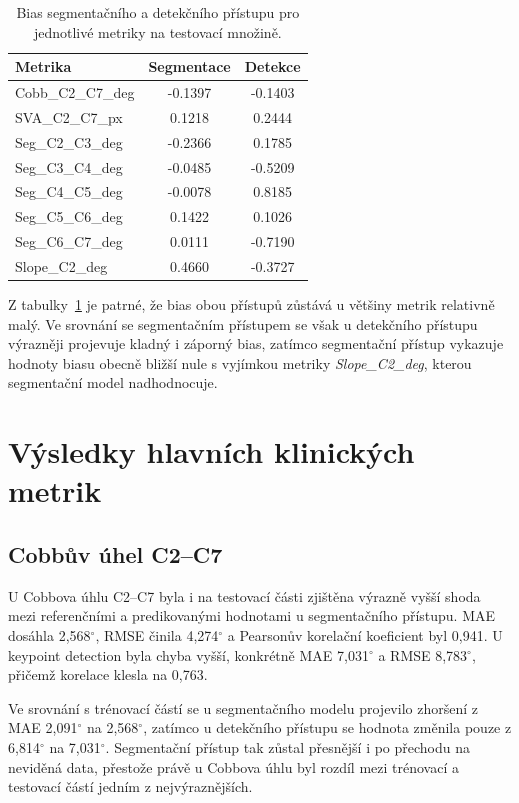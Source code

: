 \documentclass[male,czech,api_bc]{kitheses}
\begin{document}
\begin{table}[H]
\centering
\caption{Bias segmentačního a detekčního přístupu pro jednotlivé metriky na testovací množině.}
\label{tab:bias_seg_det_test}
\begin{tabular}{lcc}
\hline
Metrika & Segmentace & Detekce \\
\hline
Cobb\_C2\_C7\_deg & -0.1397 & -0.1403 \\
SVA\_C2\_C7\_px & 0.1218 & 0.2444 \\
Seg\_C2\_C3\_deg & -0.2366 & 0.1785 \\
Seg\_C3\_C4\_deg & -0.0485 & -0.5209 \\
Seg\_C4\_C5\_deg & -0.0078 & 0.8185 \\
Seg\_C5\_C6\_deg & 0.1422 & 0.1026 \\
Seg\_C6\_C7\_deg & 0.0111 & -0.7190 \\
Slope\_C2\_deg & 0.4660 & -0.3727 \\
\hline
\end{tabular}
\end{table}

Z tabulky~\ref{tab:bias_seg_det_test} je patrné, že bias obou přístupů zůstává u většiny metrik relativně malý. Ve srovnání se segmentačním přístupem se však u detekčního přístupu výrazněji projevuje kladný i záporný bias, zatímco segmentační přístup vykazuje hodnoty biasu obecně bližší nule s vyjímkou metriky \textit{Slope\_C2\_deg}, kterou segmentační model nadhodnocuje.


\section{Výsledky hlavních klinických metrik}

\subsection{Cobbův úhel C2--C7}

U Cobbova úhlu C2--C7 byla i na testovací části zjištěna výrazně vyšší shoda mezi referenčními a predikovanými hodnotami u segmentačního přístupu. MAE dosáhla 2{,}568$^\circ$, RMSE činila 4{,}274$^\circ$ a Pearsonův korelační koeficient byl 0{,}941. U keypoint detection byla chyba vyšší, konkrétně MAE 7{,}031$^\circ$ a RMSE 8{,}783$^\circ$, přičemž korelace klesla na 0{,}763.

Ve srovnání s trénovací částí se u segmentačního modelu projevilo zhoršení z MAE 2{,}091$^\circ$ na 2{,}568$^\circ$, zatímco u detekčního přístupu se hodnota změnila pouze z 6{,}814$^\circ$ na 7{,}031$^\circ$. Segmentační přístup tak zůstal přesnější i po přechodu na neviděná data, přestože právě u Cobbova úhlu byl rozdíl mezi trénovací a testovací částí jedním z nejvýraznějších.
\end{document}
